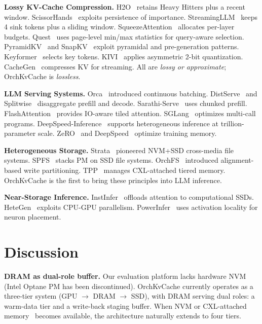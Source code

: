 \documentclass[conference]{IEEEtran}
\begin{document}
\textbf{Lossy KV-Cache Compression.} H2O~\cite{h2o} retains Heavy Hitters plus a recent window. ScissorHands~\cite{scissorhands} exploits persistence of importance. StreamingLLM~\cite{streamingllm} keeps 4 sink tokens plus a sliding window. SqueezeAttention~\cite{squeezeattention} allocates per-layer budgets. Quest~\cite{quest} uses page-level min/max statistics for query-aware selection. PyramidKV~\cite{pyramidkv} and SnapKV~\cite{snapkv} exploit pyramidal and pre-generation patterns. Keyformer~\cite{keyformer} selects key tokens. KIVI~\cite{kivi} applies asymmetric 2-bit quantization. CacheGen~\cite{cachegen} compresses KV for streaming. All are \emph{lossy or approximate}; OrchKvCache is \emph{lossless}.

\textbf{LLM Serving Systems.} Orca~\cite{orca} introduced continuous batching. DistServe~\cite{distserve} and Splitwise~\cite{splitwise} disaggregate prefill and decode. Sarathi-Serve~\cite{sarathi} uses chunked prefill. FlashAttention~\cite{flashattn,flashattn2} provides IO-aware tiled attention. SGLang~\cite{sglang} optimizes multi-call programs. DeepSpeed-Inference~\cite{deepspeed-inf} supports heterogeneous inference at trillion-parameter scale. ZeRO~\cite{zero} and DeepSpeed~\cite{deepspeed} optimize training memory.

\textbf{Heterogeneous Storage.} Strata~\cite{strata} pioneered NVM+SSD cross-media file systems. SPFS~\cite{spfs} stacks PM on SSD file systems. OrchFS~\cite{orchfs} introduced alignment-based write partitioning. TPP~\cite{tpp} manages CXL-attached tiered memory. OrchKvCache is the first to bring these principles into LLM inference.

\textbf{Near-Storage Inference.} InstInfer~\cite{instinfer} offloads attention to computational SSDs. HeteGen~\cite{hetegen} exploits CPU-GPU parallelism. PowerInfer~\cite{powerinfer} uses activation locality for neuron placement.

\section{Discussion}

\textbf{DRAM as dual-role buffer.} Our evaluation platform lacks hardware NVM (Intel Optane PM has been discontinued). OrchKvCache currently operates as a three-tier system (GPU $\to$ DRAM $\to$ SSD), with DRAM serving dual roles: a warm-data tier and a write-back staging buffer. When NVM or CXL-attached memory~\cite{tpp} becomes available, the architecture naturally extends to four tiers.
\end{document}
